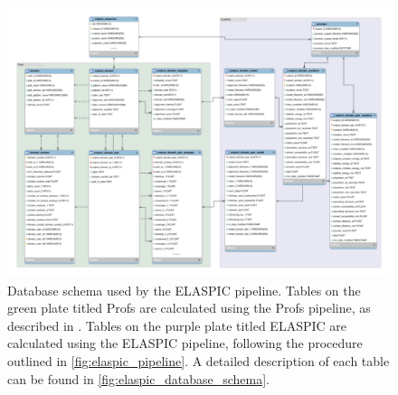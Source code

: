 \begin{figure}[ht]
	\centering
	\includegraphics[width=1.0\textwidth]{static/elaspic/elaspic_schema.pdf}
	\caption{Database schema used by the ELASPIC pipeline. Tables on the green plate titled Profs are calculated using the Profs pipeline, as described in \cite{witvliet_elaspic_2016}. Tables on the purple plate titled ELASPIC are calculated using the ELASPIC pipeline, following the procedure outlined in \ref{fig:elaspic_pipeline}. A detailed description of each table can be found in \ref{fig:elaspic_database_schema}.}
    \label{fig:elaspic_schema}
\end{figure}


